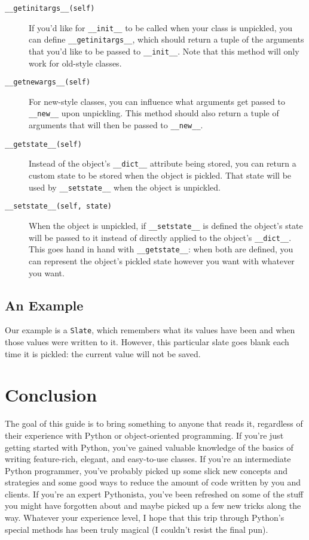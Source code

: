 \documentclass[a4paper,11pt]{article}
\newcommand{\code}[1]{\texttt{#1}}
\begin{document}
\begin{description}

\item[\code{__getinitargs__(self)}]
If you'd like for \code{__init__} to be called when your class is unpickled, you can define \code{__getinitargs__}, which should return a tuple of the arguments that you'd like to be passed to  \code{__init__}. Note that this method will only work for old-style classes.
\item[\code{__getnewargs__(self)}]
For new-style classes, you can influence what arguments get passed to \code{__new__} upon unpickling. This method should also return a tuple of arguments that will then be passed to \code{__new__}.
\item[\code{__getstate__(self)}]
Instead of the object's \code{__dict__} attribute being stored, you can return a custom state to be stored when the object is pickled. That state will be used by \code{__setstate__} when the object is unpickled.
\item[\code{__setstate__(self, state)}]
When the object is unpickled, if \code{__setstate__} is defined the object's state will be passed to it instead of directly applied to the object's \code{__dict__}. This goes hand in hand with \code{__getstate__}: when both are defined, you can represent the object's pickled state however you want with whatever you want.

\end{description}

\subsection{An Example}

Our example is a \code{Slate}, which remembers what its values have been and when those values were written to it. However, this particular slate goes blank each time it is pickled: the current value will not be saved.



\section{Conclusion}

The goal of this guide is to bring something to anyone that reads it, regardless of their experience with Python or object-oriented programming. If you're just getting started with Python, you've gained valuable knowledge of the basics of writing feature-rich, elegant, and easy-to-use classes. If you're an intermediate Python programmer, you've probably picked up some slick new concepts and strategies and some good ways to reduce the amount of code written by you and clients. If you're an expert Pythonista, you've been refreshed on some of the stuff you might have forgotten about and maybe picked up a few new tricks along the way. Whatever your experience level, I hope that this trip through Python's special methods has been truly magical (I couldn't resist the final pun).
\end{document}
